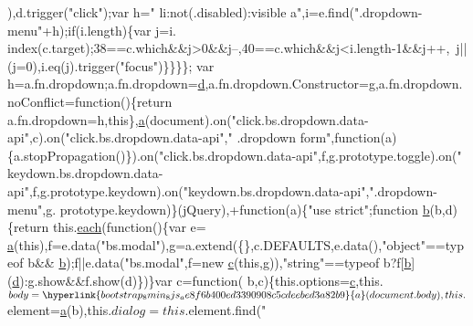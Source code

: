 \begin{DoxyCode}
      ),d.trigger(\textcolor{stringliteral}{"click"});var h=\textcolor{stringliteral}{" li:not(.disabled):visible a"},i=e.find(\textcolor{stringliteral}{".dropdown-menu"}+h);\textcolor{keywordflow}{if}(i.length)\{var j=i.
      index(c.target);38==c.which&&j>0&&j--,40==c.which&&j<i.length-1&&j++,~j||(j=0),i.eq(j).trigger(\textcolor{stringliteral}{"focus"})\}\}\}\};
      var h=a.fn.dropdown;a.fn.dropdown=\hyperlink{bootstrap_8min_8js_aeb337d295abaddb5ec3cb34cc2e2bbc9}{d},a.fn.dropdown.Constructor=g,a.fn.dropdown.noConflict=\textcolor{keyword}{function}()\{\textcolor{keywordflow}{return} 
      a.fn.dropdown=h,\textcolor{keyword}{this}\},\hyperlink{bootstrap_8min_8js_ae8f6b400ed3390908c5cdeebed3a82b9}{a}(document).on(\textcolor{stringliteral}{"click.bs.dropdown.data-api"},c).on(\textcolor{stringliteral}{"click.bs.dropdown.data-api"},\textcolor{stringliteral}{"
      .dropdown form"},\textcolor{keyword}{function}(a)\{a.stopPropagation()\}).on(\textcolor{stringliteral}{"click.bs.dropdown.data-api"},f,g.prototype.toggle).on(\textcolor{stringliteral}{"
      keydown.bs.dropdown.data-api"},f,g.prototype.keydown).on(\textcolor{stringliteral}{"keydown.bs.dropdown.data-api"},\textcolor{stringliteral}{".dropdown-menu"},g.
      prototype.keydown)\}(jQuery),+\textcolor{keyword}{function}(a)\{\textcolor{stringliteral}{"use strict"};\textcolor{keyword}{function} \hyperlink{bootstrap_8min_8js_ac0431efac4d7c393d1e70b86115cb93f}{b}(b,d)\{\textcolor{keywordflow}{return} this.\hyperlink{jquery_8min_8js_a18d9b499a0765bf2fe5f372ff2fc0236}{each}(\textcolor{keyword}{function}()\{var e=
      \hyperlink{bootstrap_8min_8js_ae8f6b400ed3390908c5cdeebed3a82b9}{a}(\textcolor{keyword}{this}),f=e.data(\textcolor{stringliteral}{"bs.modal"}),g=a.extend(\{\},c.DEFAULTS,e.data(),\textcolor{stringliteral}{"object"}==typeof b&&
      \hyperlink{bootstrap_8min_8js_ac0431efac4d7c393d1e70b86115cb93f}{b});f||e.data(\textcolor{stringliteral}{"bs.modal"},f=\textcolor{keyword}{new} \hyperlink{bootstrap_8min_8js_ad9d1ac02e33c4aed62ad517a7cb8b3fb}{c}(\textcolor{keyword}{this},g)),\textcolor{stringliteral}{"string"}==typeof b?f[\hyperlink{bootstrap_8min_8js_ac0431efac4d7c393d1e70b86115cb93f}{b}](\hyperlink{bootstrap_8min_8js_aeb337d295abaddb5ec3cb34cc2e2bbc9}{d}):g.show&&f.show(d)\})\}var c=\textcolor{keyword}{function}(
      b,c)\{this.options=\hyperlink{bootstrap_8min_8js_ad9d1ac02e33c4aed62ad517a7cb8b3fb}{c},this.$body=\hyperlink{bootstrap_8min_8js_ae8f6b400ed3390908c5cdeebed3a82b9}{a}(document.body),this.$element=\hyperlink{bootstrap_8min_8js_ae8f6b400ed3390908c5cdeebed3a82b9}{a}(b),this.$dialog=this.$element.find(\textcolor{stringliteral}{"
}
\end{DoxyCode}
